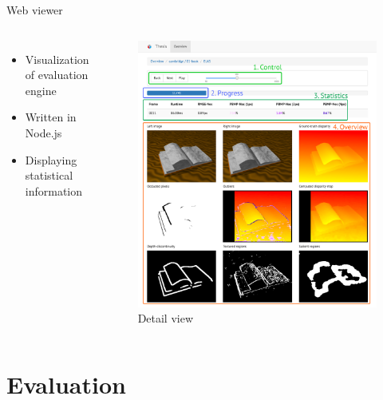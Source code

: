 \documentclass[10pt]{beamer}
\begin{document}
\begin{frame}[fragile]{Web viewer}
  \begin{columns}[onlytextwidth]
    \begin{itemize}
      \item Visualization of evaluation engine
      \item Written in Node.js
      \item Displaying statistical information
    \end{itemize}
      \begin{figure}
      \centering
      \includegraphics[width=1.0\textwidth]{../paper/src/images/result-viewer-detail.png}
      \caption{Detail view}
      \end{figure}
  \end{columns}
\end{frame}


\section{Evaluation}
\end{document}

